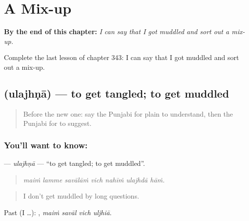 
\chapter{A Mix-up}
\label{ch:pa-a2-a-mix-up}

\begin{chapteropening}
\textbf{By the end of this chapter:} \emph{I can say that I got muddled and sort out a mix-up.}

Complete the last lesson of chapter 343: I can say that I got muddled and sort out a mix-up.
\end{chapteropening}

\section[\texorpdfstring{\pa{ਉਲਝਣਾ} (ulajhṇā)}{ਉਲਝਣਾ (ulajhṇā)}]{ (ulajhṇā) — to get tangled; to get muddled}

\label{lesson:PA-C343-ulajhna}



\begin{quote}
Before the new one: say the Punjabi for plain to understand, then the Punjabi for to suggest.
\end{quote}

\subsection*{You'll want to know: }
\textbf{} — \emph{ulajhṇā} — \textquotedblleft{}to get tangled; to get muddled\textquotedblright{}.

\begin{quote}
      
\end{quote}

\begin{quote}
\emph{maiṁ lamme savālāṁ vich nahīṁ ulajhdā hāṁ.}
\end{quote}

\begin{quote}
I don't get muddled by long questions.
\end{quote}

Past (I …):    , \emph{maiṁ savāl vich uljhiā}.

